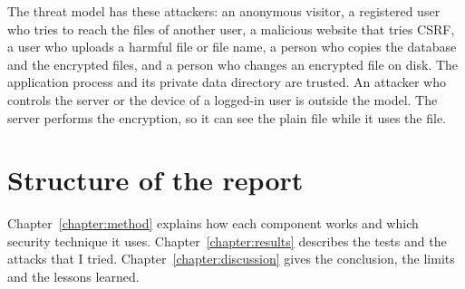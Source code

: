 The threat model has these attackers: an anonymous visitor, a registered user who tries to reach the files of another user, a malicious website that tries CSRF, a user who uploads a harmful file or file name, a person who copies the database and the encrypted files, and a person who changes an encrypted file on disk. The application process and its private data directory are trusted. An attacker who controls the server or the device of a logged-in user is outside the model. The server performs the encryption, so it can see the plain file while it uses the file.

\section{Structure of the report}

Chapter~\ref{chapter:method} explains how each component works and which security technique it uses. Chapter~\ref{chapter:results} describes the tests and the attacks that I tried. Chapter~\ref{chapter:discussion} gives the conclusion, the limits and the lessons learned.
